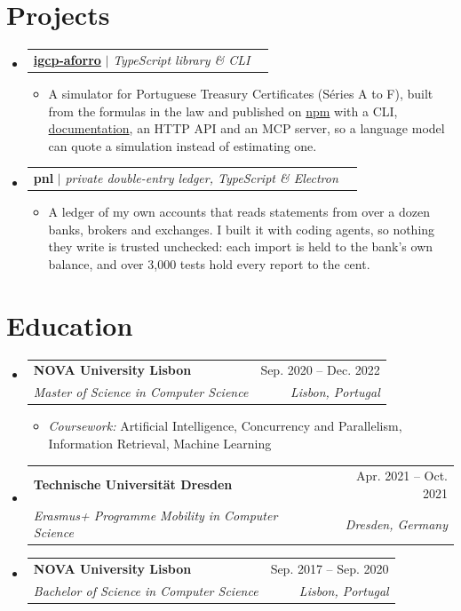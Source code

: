 \documentclass[a4paper,11pt]{article}
\makeatletter
\newcommand{\resumeItem}[1]{
  \item\small{
    {#1\vspace{-2pt}}
  }
}
\newcommand{\resumeSubheading}[4]{
  \vspace{-2pt}\item
    \begin{tabular*}{0.97\textwidth}[t]{l@{\extracolsep{\fill}}r}
      \textbf{#1} & #2 \\
      \textit{\small#3} & \textit{\small #4} \\
    \end{tabular*}\vspace{-7pt}
}
\newcommand{\resumeProjectHeading}[2]{
    \item
    \begin{tabular*}{0.97\textwidth}{l@{\extracolsep{\fill}}r}
      \small#1 & #2 \\
    \end{tabular*}\vspace{-7pt}
}
\newcommand{\resumeSubHeadingListStart}{\begin{itemize}[leftmargin=0.15in, label={}]}
\newcommand{\resumeSubHeadingListEnd}{\end{itemize}}
\newcommand{\resumeItemListStart}{\begin{itemize}}
\newcommand{\resumeItemListEnd}{\end{itemize}\vspace{-5pt}}
\makeatother
\begin{document}
\section{Projects}
  \resumeSubHeadingListStart

    \resumeProjectHeading
      {\textbf{\href{https://github.com/pprimor/igcp-aforro}{igcp-aforro}} $|$ \emph{TypeScript library \& CLI}}{}
      \resumeItemListStart
        \resumeItem{A simulator for Portuguese Treasury Certificates (Séries A to F), built from the formulas in the law and published on \href{https://www.npmjs.com/package/igcp-aforro}{npm} with a CLI, \href{https://igcp-aforro.primor.me/}{documentation}, an HTTP API and an MCP server, so a language model can quote a simulation instead of estimating one.}
      \resumeItemListEnd

    \resumeProjectHeading
      {\textbf{pnl} $|$ \emph{private double-entry ledger, TypeScript \& Electron}}{}
      \resumeItemListStart
        \resumeItem{A ledger of my own accounts that reads statements from over a dozen banks, brokers and exchanges. I built it with coding agents, so nothing they write is trusted unchecked: each import is held to the bank's own balance, and over 3,000 tests hold every report to the cent.}
      \resumeItemListEnd

  \resumeSubHeadingListEnd

\section{Education}
\resumeSubHeadingListStart

  \resumeSubheading
    {NOVA University Lisbon}{Sep. 2020 -- Dec. 2022}
    {Master of Science in Computer Science}{Lisbon, Portugal}
      \resumeItemListStart
        \resumeItem{\textit{Coursework:} Artificial Intelligence, Concurrency and Parallelism, Information Retrieval, Machine Learning}
      \resumeItemListEnd

  \resumeSubheading
    {Technische Universität Dresden}{Apr. 2021 -- Oct. 2021}
    {Erasmus+ Programme Mobility in Computer Science}{Dresden, Germany}

  \resumeSubheading
    {NOVA University Lisbon}{Sep. 2017 -- Sep. 2020}
    {Bachelor of Science in Computer Science}{Lisbon, Portugal}

\resumeSubHeadingListEnd
\end{document}
